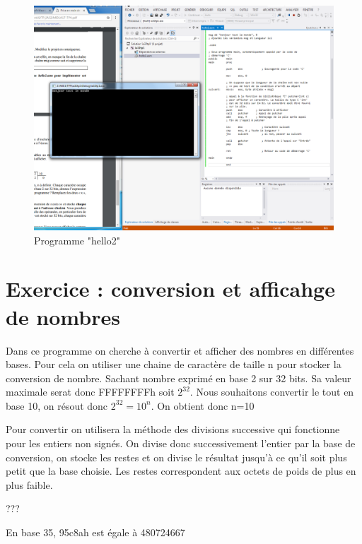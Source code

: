 \documentclass[11pt]{report}
\begin{document}
\begin{figure}[h]
\includegraphics[width=15cm]{Capture4.PNG}
\caption{Programme "hello2"}
\end{figure}

\section{Exercice : conversion et afficahge de nombres}

Dans ce programme on cherche à convertir et afficher des nombres en différentes bases. 
Pour cela on utiliser une chaine de caractère de taille n pour stocker la conversion de nombre. Sachant nombre exprimé en base 2 sur 32 bits. Sa valeur maximale serat donc FFFFFFFFh soit $2^{32}$. Nous souhaitons convertir le tout en base 10, on résout donc $2^{32}=10^n$. On obtient donc n=10

Pour convertir on utilisera la méthode des divisions successive qui fonctionne pour les entiers non signés. On divise donc successivement l'entier par la base de conversion, on stocke les restes et on divise le résultat jusqu'à ce qu'il soit plus petit que la base choisie. Les restes correspondent aux octets de poids de plus en plus faible.

???

\medskip

En base 35,  95c8ah est égale à 480724667
\end{document}
